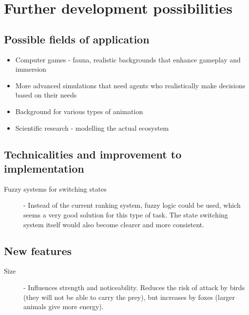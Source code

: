 \chapter{Further development possibilities}
\label{furtherDevelopmentPossibilitiesChapter}
\section{Possible fields of application}
\begin{itemize}
    \item Computer games - fauna, realistic backgrounds that enhance gameplay and immersion
    \item More advanced simulations that need agents who realistically make decisions based on their needs
    \item Background for various types of animation
    \item Scientific research - modelling the actual ecosystem
\end{itemize}

\section{Technicalities and improvement to implementation}
\begin{description}
    \item[Fuzzy systems for switching states] - Instead of the current ranking system, fuzzy logic could be used, which seems a very good solution for this type of task. The state switching system itself would also become clearer and more consistent.
\end{description}

\section{New features}
\begin{description}
    \item[Size] - Influences strength and noticeability. Reduces the risk of attack by birds (they will not be able to carry the prey), but increases by foxes (larger animals give more energy).
\end{description}

